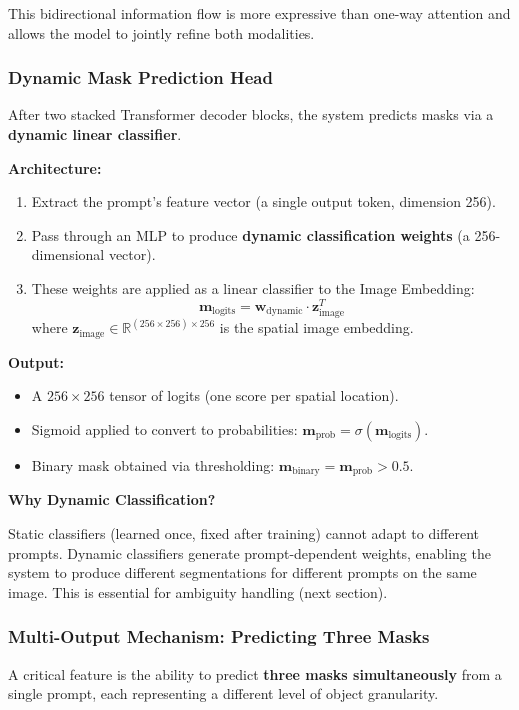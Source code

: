 This bidirectional information flow is more expressive than one-way attention and allows the model to jointly refine both modalities.

\subsubsection{Dynamic Mask Prediction Head}

After two stacked Transformer decoder blocks, the system predicts masks via a \textbf{dynamic linear classifier}.

\textbf{Architecture:}
\begin{enumerate}
    \item Extract the prompt's feature vector (a single output token, dimension 256).
    \item Pass through an MLP to produce \textbf{dynamic classification weights} (a 256-dimensional vector).
    \item These weights are applied as a linear classifier to the Image Embedding:
       \[ \mathbf{m}_{\text{logits}} = \mathbf{w}_{\text{dynamic}} \cdot \mathbf{z}_{\text{image}}^T \]
       where $\mathbf{z}_{\text{image}} \in \mathbb{R}^{(256 \times 256) \times 256}$ is the spatial image embedding.
\end{enumerate}

\textbf{Output:}
\begin{itemize}
    \item A $256 \times 256$ tensor of logits (one score per spatial location).
    \item Sigmoid applied to convert to probabilities: $\mathbf{m}_{\text{prob}} = \sigma(\mathbf{m}_{\text{logits}})$.
    \item Binary mask obtained via thresholding: $\mathbf{m}_{\text{binary}} = \mathbf{m}_{\text{prob}} > 0.5$.
\end{itemize}

\textbf{Why Dynamic Classification?}

Static classifiers (learned once, fixed after training) cannot adapt to different prompts. Dynamic classifiers generate prompt-dependent weights, enabling the system to produce different segmentations for different prompts on the same image. This is essential for ambiguity handling (next section).

\subsubsection{Multi-Output Mechanism: Predicting Three Masks}
A critical feature is the ability to predict \textbf{three masks simultaneously} from a single prompt, each representing a different level of object granularity.

